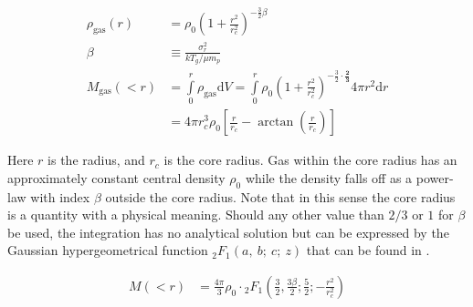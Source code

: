 \documentclass[MScProj_TLRH_ClusterEnergy.tex]{subfiles}
\begin{document}
\begin{align}
    \rho_{\text{gas}} (r) &= \rho_0
        \left( 1 + \frac{r^2}{r_c^2} \right)^{-\frac{3}{2}\beta} \label{eq:betamodel}  \\
        \beta &\equiv \frac{\sigma_r^2}{kT_g/\mu m_p} \label{eq:beta} \\
        M_{\text{gas}}(<r) &= \int\limits_{0}^{r} \rho_{\text{gas}} \mathrm{d}V
           = \int\limits_{0}^{r} \rho_0 \left( 1 + \frac{r^2}{r_c^2} \right)
           ^{-\frac{3}{2} \cdot \mathbf{\frac{2}{3}}} 4 \pi r^2 \mathrm{d}r \nonumber \\
          &= 4 \pi r_c^3 \rho_0
            \left[ \frac{r}{r_c} - \arctan\left(\frac{r}{r_c}\right) \right]
            \label{eq:gasmass}
\end{align}

Here $r$ is the radius, and $r_c$ is the core radius. Gas within the core
radius has an approximately constant central density $\rho_0$ while the density
falls off as a power-law with index $\beta$ outside the core radius. Note that 
in this sense the core radius is a quantity with a physical meaning. 
Should any other value than $2/3$ or $1$ for $\beta$ be used, the integration
has no analytical solution but can be expressed by the Gaussian
hypergeometrical function $_{2}F_{1}(a,~b;~c;~z)$ that can be found in
\citet[ch. 15]{1972hmfw.book.....A}.

\begin{align}
        M(<r) &= \frac{4 \pi}{3} \rho_0 \cdot  {_{2}F_{1}}
            \left(\frac{3}{2}, \frac{3\beta}{2}; \frac{5}{2}; -\frac{r^2}{r_c^2}\right)
            \label{eq:hypergeometrical}
\end{align}






\SubfileBibliography
\end{document}
